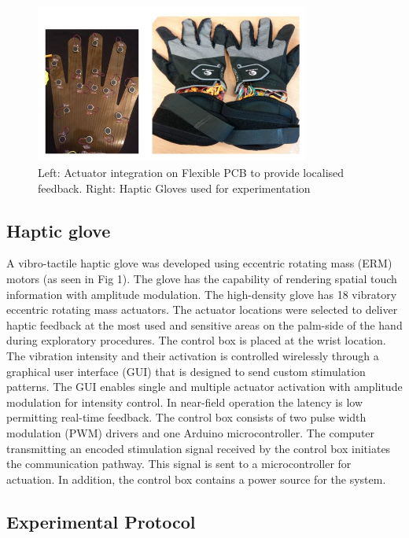 \documentclass[]{article}
\begin{document}
\begin{figure}
	\centering
	\includegraphics[width=0.8\textwidth]{Capture.jpg}
	\caption{Left: Actuator integration on Flexible PCB to provide localised feedback. Right: Haptic Gloves used for experimentation}
	
\end{figure}

\subsection{Haptic glove}
A vibro-tactile haptic glove was developed using eccentric rotating mass (ERM) motors (as seen in Fig 1). The glove has the capability of rendering spatial touch information with amplitude modulation. The high-density glove has 18 vibratory eccentric rotating mass actuators. The actuator locations were selected to deliver haptic feedback at the most used and sensitive areas on the palm-side of the hand during exploratory procedures. The control box is placed at the wrist location. The vibration intensity and their activation is controlled wirelessly through a graphical user interface (GUI) that is designed to send custom stimulation patterns. The GUI enables single and multiple actuator activation with amplitude modulation for intensity control.  In near-ﬁeld operation the latency is low permitting real-time feedback. The control box consists of two pulse width modulation (PWM) drivers and one Arduino microcontroller. The computer transmitting an encoded stimulation signal received by the control box initiates the communication pathway. This signal is sent to a microcontroller for actuation. In addition, the control box contains a power source for the system. 



\subsection{Experimental Protocol}
\end{document}
